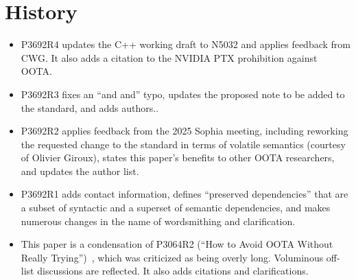 \begin{abstract}
	Attempts to create memory models that forbid out-of-thin-air
	(OOTA) behaviors of C++  accesses
	have been either non-executable, complex, or unloved by
	implementers.
	At the same time, we know of no instances of OOTA behavior in real C++
	implementations.

	We focus on shared-memory programs and C++ implementations based
	on traditional compilers and hardware, including CPUs and GPGPUs,
	thus enabling analysis of semantic dependencies and OOTA behaviors
	by means of existing hardware models.
	We show that these models' constraints prevent OOTA cycles from
	occurring in undefined-behavior-free C++ programs running on
	such implementations, provided the cycles involve only volatile
	atomics.
	We accommodate nonvolatile atomics by defining ``quasi-volatile''
	behavior and show that for existing implementations doing per-thread
	analysis and optimization, this behavior not only avoids OOTA
	but also is necessary to avoid
	incorrectly evaluating arithmetic expressions involving atomic
	accesses.

	It follows that enforcing OOTA avoidance requires no special
	action from implementations and no changes to user code.
	As a consequence, we are asking for only for a small non-normative
	change to the standard.

	Audience: CWG, LWG
\end{abstract}
\maketitle{}

\section*{History}

\begin{itemize}
\item	P3692R4 updates the C++ working draft to N5032 and applies
	feedback from CWG.  It also adds a citation to the NVIDIA PTX
	prohibition against OOTA.
\item	P3692R3 fixes an ``and and'' typo, updates the proposed note
	to be added to the standard, and adds authors..
\item	P3692R2 applies feedback from the 2025 Sophia meeting,
	including reworking the requested change to the standard
	in terms of volatile semantics (courtesy of Olivier Giroux),
	states this paper's benefits to other OOTA researchers, and
	updates the author list.
\item	P3692R1 adds contact information, defines ``preserved
	dependencies'' that are a subset of syntactic and a superset of
	semantic dependencies, and makes numerous changes in the name
	of wordsmithing and clarification.
\item	This paper is a condensation of P3064R2 (``How to Avoid OOTA
	Without Really
	Trying'')~\cite{PaulEMcKenney2023P3046R2/OOTAwithoutTrying},
	which was criticized as being overly long.
	Voluminous off-list discussions are reflected.
	It also adds citations and clarifications.
\end{itemize}

